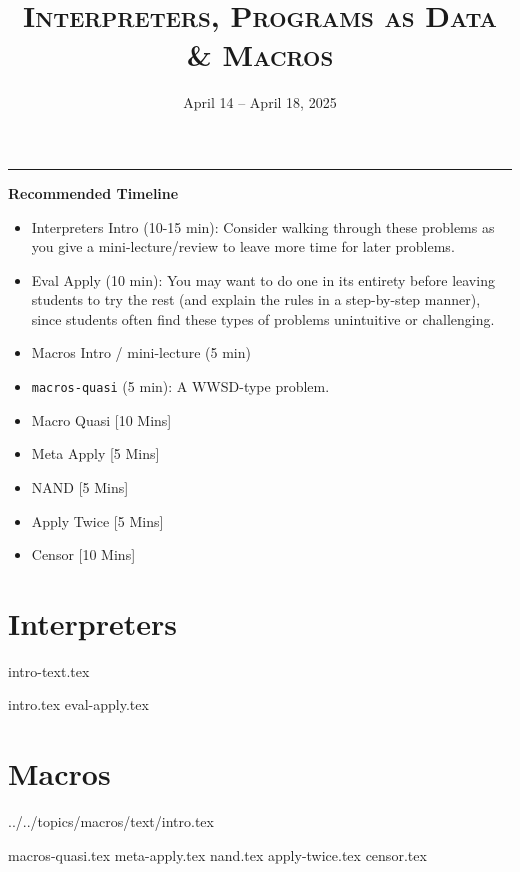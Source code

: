 \documentclass{exam}
\title{\textsc{Interpreters, Programs as Data \& Macros}}
\date{April 14 -- April 18, 2025}
\begin{document}
\maketitle
\rule{\textwidth}{0.15em}
\fontsize{12}{15}\selectfont


\begin{guide}
\textbf{Recommended Timeline}
\begin{itemize}
  \item Interpreters Intro (10-15 min): Consider walking through these problems as 
  you give a mini-lecture/review to leave more time for later problems.
  \item Eval Apply (10 min): You may want to do one in its entirety before leaving students to try the rest
  (and explain the rules in a step-by-step manner), since students often find these types of problems unintuitive or challenging.
  \item Macros Intro / mini-lecture (5 min)
  \item \lstinline{macros-quasi} (5 min): A WWSD-type problem.
  \item Macro Quasi [10 Mins]
  \item Meta Apply [5 Mins]
  \item NAND [5 Mins]
  \item Apply Twice [5 Mins]
  \item Censor [10 Mins]
\end{itemize}
\newpage
\end{guide}


\section{Interpreters}
{intro-text.tex}
\begin{questions}
{intro.tex}
{eval-apply.tex}
\end{questions}

\newpage
\section{Macros}
 {../../topics/macros/text/}{intro.tex}
\begin{questions}
{macros-quasi.tex}
 {meta-apply.tex}
  {nand.tex}
  {apply-twice.tex}
  {censor.tex}
\end{questions}
\end{document}
